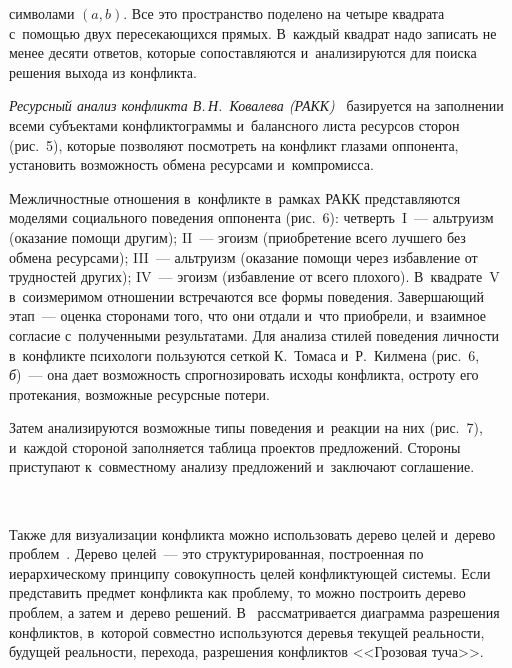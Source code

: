 \begin{multicols}{2}

\noindent
 символами 
$(a, b)$. Все это пространство поделено на четыре квад\-ра\-та с~по\-мощью двух 
пе\-ре\-се\-ка\-ющих\-ся прямых.
     В~каж\-дый квадрат надо записать не менее десяти ответов, которые 
со\-по\-став\-ля\-ют\-ся и~анализируются для поиска решения выхода из кон\-фликта. 
{

}
  
  \textit{Ресурсный анализ конфликта В.\,Н.~Ковалева (РАКК)}~\cite{22-r} 
базируется на заполнении всеми субъектами конфликтограммы 
и~балансного листа ресурсов сторон (рис.~5), которые позволяют по\-смот\-реть 
на конфликт глазами оппонента, установить воз\-мож\-ность обмена ресурсами 
и~компромисса.
  


  Межличностные отношения в~конфликте в~рамках РАКК представляются 
моделями социального поведения оппонента (рис.~6): четверть~I~--- альтруизм 
(оказание помощи другим); II~--- эгоизм (приобретение всего лучшего без 
обмена ресурсами); III~--- альтруизм (оказание помощи через избавление от 
трудностей других); IV~--- эгоизм (избавление от всего плохого). 
В~квадрате~V в~соизмеримом отношении встречаются все формы поведения. 
Завершающий этап~--- оценка сторонами того, что они отдали и~что приобрели, 
и~взаимное согласие с~полученными результатами. Для анализа стилей 
поведения личности в~конфликте психологи пользуются сеткой К.~Томаса 
и~Р.~Килмена (рис.~6,\,\textit{б})~--- она дает возможность спрогнозировать 
исходы конфликта, остроту его протекания, возможные ресурсные потери. 
  

  Затем анализируются возможные типы поведения и~реакции на них (рис.~7), 
и~каждой стороной заполняется таблица проектов предложений. 
Стороны приступают к~совместному анализу предложений и~заключают 
соглашение.
   
  \begin{figure*} %
  \vspace*{1pt}
    \begin{center}  
  \mbox{%
 \epsfxsize=111.089mm 
 }
\end{center}
\vspace*{-9pt}
   \end{figure*}
  
  Также для визуализации конфликта можно использовать дерево целей 
и~дерево проблем~\cite{23-r}. Дерево целей~--- это структурированная, 
построенная по иерархическому принципу совокупность целей 
конфликтующей системы. Если представить предмет конфликта как проблему, 
то можно построить дерево проблем, а затем и~дерево решений. В~\cite{24-r} 
рассматривается диаграмма разрешения конфликтов, в~которой совместно 
используются деревья текущей реальности, будущей реальности, перехода, 
разрешения конфликтов <<Грозовая туча>>. 


\end{multicols}
